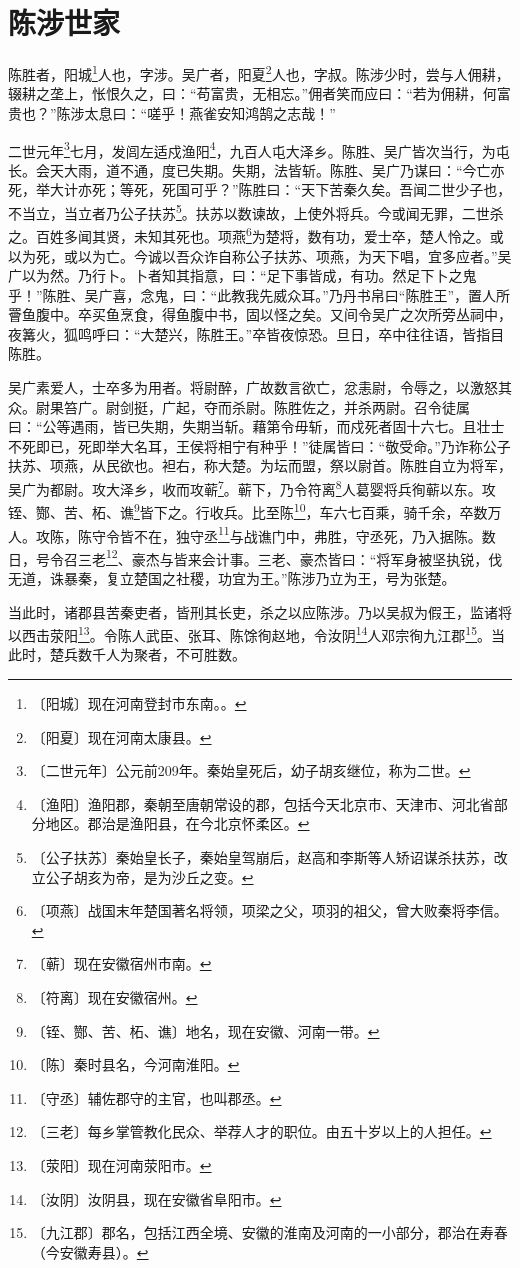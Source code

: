 \documentclass[12pt,UTF-8,openany]{ctexbook}
\begin{document}
\chapter{陈涉世家}

\begin{normalsize}
    
    陈胜者，阳城\footnote{〔阳城〕现在河南登封市东南。。}人也，字涉。吴广者，阳夏\footnote{〔阳夏〕现在河南太康县。}人也，字叔。陈涉少时，尝与人佣耕，辍耕之垄上，怅恨久之，曰：“苟富贵，无相忘。”佣者笑而应曰：“若为佣耕，何富贵也？”陈涉太息曰：“嗟乎！燕雀安知鸿鹄之志哉！”
    
    二世元年\footnote{〔二世元年〕公元前209年。秦始皇死后，幼子胡亥继位，称为二世。}七月，发闾左适戍渔阳\footnote{〔渔阳〕渔阳郡，秦朝至唐朝常设的郡，包括今天北京市、天津市、河北省部分地区。郡治是渔阳县，在今北京怀柔区。}，九百人屯大泽乡。陈胜、吴广皆次当行，为屯长。会天大雨，道不通，度已失期。失期，法皆斩。陈胜、吴广乃谋曰：“今亡亦死，举大计亦死；等死，死国可乎？”陈胜曰：“天下苦秦久矣。吾闻二世少子也，不当立，当立者乃公子扶苏\footnote{〔公子扶苏〕秦始皇长子，秦始皇驾崩后，赵高和李斯等人矫诏谋杀扶苏，改立公子胡亥为帝，是为沙丘之变。}。扶苏以数谏故，上使外将兵。今或闻无罪，二世杀之。百姓多闻其贤，未知其死也。项燕\footnote{〔项燕〕战国末年楚国著名将领，项梁之父，项羽的祖父，曾大败秦将李信。}为楚将，数有功，爱士卒，楚人怜之。或以为死，或以为亡。今诚以吾众诈自称公子扶苏、项燕，为天下唱，宜多应者。”吴广以为然。乃行卜。卜者知其指意，曰：“足下事皆成，有功。然足下卜之鬼乎！”陈胜、吴广喜，念鬼，曰：“此教我先威众耳。”乃丹书帛曰“陈胜王”，置人所罾鱼腹中。卒买鱼烹食，得鱼腹中书，固以怪之矣。又间令吴广之次所旁丛祠中，夜篝火，狐鸣呼曰：“大楚兴，陈胜王。”卒皆夜惊恐。旦日，卒中往往语，皆指目陈胜。
    
    吴广素爱人，士卒多为用者。将尉醉，广故数言欲亡，忿恚尉，令辱之，以激怒其众。尉果笞广。尉剑挺，广起，夺而杀尉。陈胜佐之，并杀两尉。召令徒属曰：“公等遇雨，皆已失期，失期当斩。藉第令毋斩，而戍死者固十六七。且壮士不死即已，死即举大名耳，王侯将相宁有种乎！”徒属皆曰：“敬受命。”乃诈称公子扶苏、项燕，从民欲也。袒右，称大楚。为坛而盟，祭以尉首。陈胜自立为将军，吴广为都尉。攻大泽乡，收而攻蕲\footnote{〔蕲〕现在安徽宿州市南。}。蕲下，乃令符离\footnote{〔符离〕现在安徽宿州。}人葛婴将兵徇蕲以东。攻铚、酂、苦、柘、谯\footnote{〔铚、酂、苦、柘、谯〕地名，现在安徽、河南一带。}皆下之。行收兵。比至陈\footnote{〔陈〕秦时县名，今河南淮阳。}，车六七百乘，骑千余，卒数万人。攻陈，陈守令皆不在，独守丞\footnote{〔守丞〕辅佐郡守的主官，也叫郡丞。}与战谯门中，弗胜，守丞死，乃入据陈。数日，号令召三老\footnote{〔三老〕每乡掌管教化民众、举荐人才的职位。由五十岁以上的人担任。}、豪杰与皆来会计事。三老、豪杰皆曰：“将军身被坚执锐，伐无道，诛暴秦，复立楚国之社稷，功宜为王。”陈涉乃立为王，号为张楚。
    
    当此时，诸郡县苦秦吏者，皆刑其长吏，杀之以应陈涉。乃以吴叔为假王，监诸将以西击荥阳\footnote{〔荥阳〕现在河南荥阳市。}。令陈人武臣、张耳、陈馀徇赵地，令汝阴\footnote{〔汝阴〕汝阴县，现在安徽省阜阳市。}人邓宗徇九江郡\footnote{〔九江郡〕郡名，包括江西全境、安徽的淮南及河南的一小部分，郡治在寿春（今安徽寿县）。}。当此时，楚兵数千人为聚者，不可胜数。
\end{normalsize}
\end{document}
